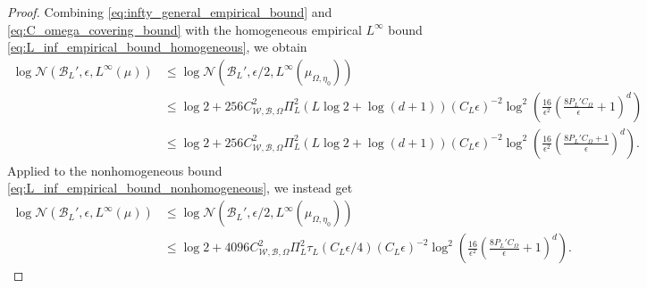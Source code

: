 \documentclass{article}
\def\cB{{\mathcal{B}}}
\def\cN{{\mathcal{N}}}
\def\cW{{\mathcal{W}}}
\begin{document}
\begin{appendices}
\begin{proof}
    Combining \eqref{eq:infty_general_empirical_bound} and \eqref{eq:C_omega_covering_bound} with the homogeneous empirical $L^\infty$ bound \eqref{eq:L_inf_empirical_bound_homogeneous}, we obtain
    \begin{align}
        \log \cN(\cB_L', \epsilon, L^\infty(\mu)) &\leq \log \cN(\cB_L', \epsilon/2, L^\infty(\mu_{\Omega, \eta_0})) \\
        &\leq \log 2 +  256 C_{\cW, \cB, \Omega}^2 \Pi_L^2 \left(L \log 2 + \log(d+1) \right) (C_L \epsilon)^{-2} \log^2 \left( \frac{16}{\epsilon^2} \left( \frac{8 P_L' C_{\Omega}}{\epsilon}  + 1\right)^d \right) \\
        &\leq \log 2 +  256 C_{\cW, \cB, \Omega}^2 \Pi_L^2 \left(L \log 2 + \log(d+1) \right) (C_L \epsilon)^{-2} \log^2 \left( \frac{16}{\epsilon^2} \left( \frac{8 P_L' C_{\Omega} + 1}{\epsilon} \right)^d \right).
    \end{align}
     Applied to the nonhomogeneous bound \eqref{eq:L_inf_empirical_bound_nonhomogeneous}, we instead get
    \begin{align}
        \log \cN(\cB_L', \epsilon, L^\infty(\mu)) &\leq \log \cN(\cB_L', \epsilon/2, L^\infty(\mu_{\Omega, \eta_0})) \\
        &\leq \log 2 +  4096 C_{\cW, \cB, \Omega}^2 \Pi_L^2 \tau_L(C_L \epsilon/4) (C_L \epsilon)^{-2} \log^2 \left( \frac{16}{\epsilon^2} \left( \frac{8 P_L' C_{\Omega}}{\epsilon}  + 1\right)^d \right).
    \end{align}


\end{proof}
\end{appendices}
\end{document}
